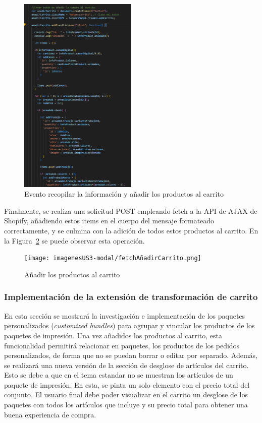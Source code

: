 \documentclass[12pt]{article}
\begin{document}
\begin{figure}[ht]
    \centering
    \includegraphics[width=0.5\textwidth]{imagenesUS3-modal/AnadirCarritoParte1addEventListenerCracionBoton.png}
    \caption{\label{fig:addCarritoEvento} Evento recopilar la información y añadir los productos al carrito}
    \vspace{\fill}
\end{figure}

Finalmente, se realiza una solicitud POST empleando fetch a la API de AJAX de Shopify, añadiendo estos items en el cuerpo 
del mensaje formateado correctamente, y se culmina con la adición de todos estos productos al carrito. En la Figura~\ref{fig:addCarritoFuncion} se puede
observar esta operación.

\begin{figure}[ht]
    \centering
    \texttt{[image: imagenesUS3-modal/fetchAñadirCarrito.png]}
    \caption{\label{fig:addCarritoFuncion} Añadir los productos al carrito}
    \vspace{\fill}
\end{figure}

\clearpage
\subsubsection{Implementación de la extensión de transformación de carrito}
En esta sección se mostrará la investigación e implementación de los paquetes personalizados (\textit{customized bundles}) para agrupar y vincular los
productos de los paquetes de impresión. Una vez añadidos los productos al carrito, esta funcionalidad permitirá relacionar en paquetes, los productos de los pedidos personalizados, de forma que no se puedan borrar
o editar por separado. Además, se realizará una nueva versión de la sección de desglose de artículos del carrito. Esto se debe a que en el tema estandar no se muestran los artículos de un paquete 
de impresión. En esta, se pinta un solo elemento con el precio total del conjunto. El usuario final debe poder visualizar en el carrito un desglose de los paquetes con todos los artículos que incluye y su precio 
total para obtener una buena experiencia de compra.
\end{document}
